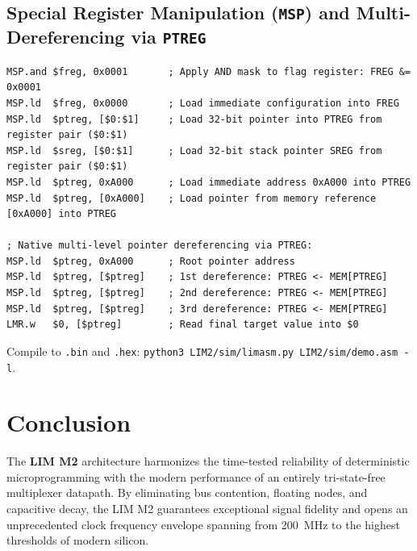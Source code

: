 \documentclass[11pt,a4paper]{article}
\begin{document}
\subsection{Special Register Manipulation (\texttt{MSP}) and Multi-Dereferencing via \texttt{PTREG}}
\begin{verbatim}
MSP.and $freg, 0x0001       ; Apply AND mask to flag register: FREG &= 0x0001
MSP.ld  $freg, 0x0000       ; Load immediate configuration into FREG
MSP.ld  $ptreg, [$0:$1]     ; Load 32-bit pointer into PTREG from register pair ($0:$1)
MSP.ld  $sreg, [$0:$1]      ; Load 32-bit stack pointer SREG from register pair ($0:$1)
MSP.ld  $ptreg, 0xA000      ; Load immediate address 0xA000 into PTREG
MSP.ld  $ptreg, [0xA000]    ; Load pointer from memory reference [0xA000] into PTREG

; Native multi-level pointer dereferencing via PTREG:
MSP.ld  $ptreg, 0xA000      ; Root pointer address
MSP.ld  $ptreg, [$ptreg]    ; 1st dereference: PTREG <- MEM[PTREG]
MSP.ld  $ptreg, [$ptreg]    ; 2nd dereference: PTREG <- MEM[PTREG]
MSP.ld  $ptreg, [$ptreg]    ; 3rd dereference: PTREG <- MEM[PTREG]
LMR.w   $0, [$ptreg]        ; Read final target value into $0
\end{verbatim}
Compile to \texttt{.bin} and \texttt{.hex}: \texttt{python3 LIM2/sim/limasm.py LIM2/sim/demo.asm -l}.

\section{Conclusion}
The \textbf{LIM M2} architecture harmonizes the time-tested reliability of deterministic microprogramming with the modern performance of an entirely tri-state-free multiplexer datapath. By eliminating bus contention, floating nodes, and capacitive decay, the LIM M2 guarantees exceptional signal fidelity and opens an unprecedented clock frequency envelope spanning from 200~MHz to the highest thresholds of modern silicon.
\end{document}
